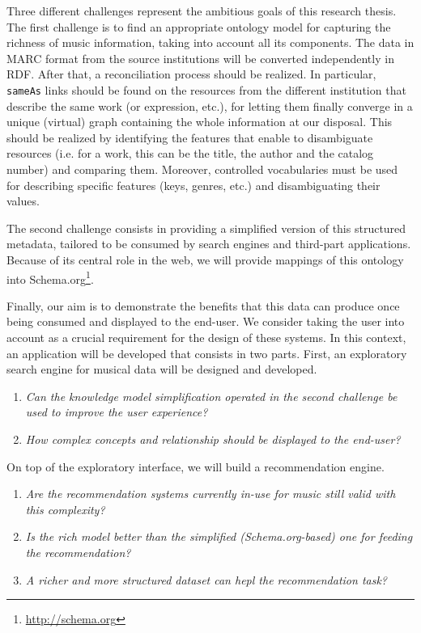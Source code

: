\documentclass[a4paper,11pt]{report}
\begin{document}
Three different challenges represent the ambitious goals of this research thesis. The first challenge is to find an appropriate ontology model for capturing the richness of music information, taking into account all its components. The data in MARC format from the source institutions will be converted independently in RDF. After that, a reconciliation process should be realized. In particular, \texttt{sameAs} links should be found on the resources from the different institution that describe the same work (or expression, etc.), for letting them finally converge in a unique (virtual) graph containing the whole information at our disposal. This should be realized by identifying the features that enable to disambiguate resources (i.e. for a work, this can be the title, the author and the catalog number) and comparing them. Moreover, controlled vocabularies must be used for describing specific features (keys, genres, etc.) and disambiguating their values.

The second challenge consists in providing a simplified version of this structured metadata, tailored to be consumed by search engines and third-part applications. Because of its central role in the web, we will provide mappings of this ontology into Schema.org\footnote{\url{http://schema.org}}.

Finally, our aim is to demonstrate the benefits that this data can produce once being consumed and displayed to the end-user. We consider taking the user into account as a crucial requirement for the design of these systems. In this context, an application will be developed that consists in two parts. First, an exploratory search engine for musical data will be designed and developed.
\begin{enumerate}
 \item \textit{Can the knowledge model simplification operated in the second challenge be used to improve the user experience?} 
 \item \textit{How complex concepts and relationship should be displayed to the end-user?}
\end{enumerate}
On top of the exploratory interface, we will build a recommendation engine.
\begin{enumerate}
 \item \textit{Are the recommendation systems currently in-use for music still valid with this complexity?}
 \item \textit{Is the rich model better than the simplified (Schema.org-based) one for feeding the recommendation?}
 \item \textit{A richer and more structured dataset can hepl the recommendation task?}
\end{enumerate}
\end{document}
